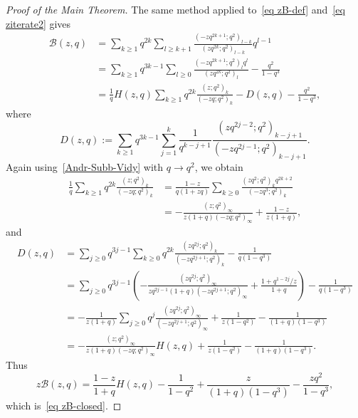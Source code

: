 \documentclass[10pt,a4paper]{amsart}
\numberwithin{equation}{section}
\begin{document}
\begin{proof}[Proof of the Main Theorem]
The same method applied to~\eqref{eq zB-def} and~\eqref{eq ziterate2} gives
\begin{align*}
\mathcal B(z,q)
&=\sum_{k\ge 1}q^{2k}\sum_{l\ge k+1}
\frac{(-zq^{2k+1};q^2)_{l-k}}{(zq^{2k};q^2)_{l-k}}q^{l-1}\\
&=\sum_{k\ge 1}q^{3k-1}\sum_{l\ge 0}
\frac{(-zq^{2k+1};q^2)_l q^l}{(zq^{2k};q^2)_l}-\frac{q^2}{1-q^3}\\
&=\frac{1}{q}H(z,q)\sum_{k\ge 1}q^{2k}\frac{(z;q^2)_k}{(-zq;q^2)_k}
-D(z,q)-\frac{q^2}{1-q^3},
\end{align*}
where
\[
D(z,q):=\sum_{k\ge 1}q^{3k-1}\sum_{j=1}^k\frac{1}{q^{k-j+1}}
\frac{(zq^{2j-2};q^2)_{k-j+1}}{(-zq^{2j-1};q^2)_{k-j+1}}.
\]
Again using~\eqref{Andr-Subb-Vidy} with $q\to q^2$, we obtain
\begin{align*}
\frac{1}{q}\sum_{k\ge 1}q^{2k}\frac{(z;q^2)_k}{(-zq;q^2)_k}
&=\frac{1-z}{q(1+zq)}\sum_{k\ge 0}\frac{(zq^2;q^2)_k q^{2k+2}}{(-zq^3;q^2)_k}\\
&=-\frac{(z;q^2)_\infty}{z(1+q)(-zq;q^2)_\infty}+\frac{1-z}{z(1+q)},
\end{align*}
and
\begin{align*}
D(z,q)
&=\sum_{j\ge 0}q^{3j-1}\sum_{k\ge 0}q^{2k}\frac{(zq^{2j};q^2)_k}{(-zq^{2j+1};q^2)_k}-\frac{1}{q(1-q^3)}\\
&=\sum_{j\ge 0}q^{3j-1}
\left(
-\frac{(zq^{2j};q^2)_\infty}{zq^{2j-1}(1+q)(-zq^{2j+1};q^2)_\infty}
+\frac{1+q^{1-2j}/z}{1+q}
\right)-\frac{1}{q(1-q^3)}\\
&=-\frac{1}{z(1+q)}\sum_{j\ge 0}q^j
\frac{(zq^{2j};q^2)_\infty}{(-zq^{2j+1};q^2)_\infty}
+\frac{1}{z(1-q^2)}-\frac{1}{(1+q)(1-q^3)}\\
&=-\frac{(z;q^2)_\infty}{z(1+q)(-zq;q^2)_\infty}H(z,q)
+\frac{1}{z(1-q^2)}-\frac{1}{(1+q)(1-q^3)}.
\end{align*}
Thus
\[
z\mathcal B(z,q)=\frac{1-z}{1+q}H(z,q)-\frac{1}{1-q^2}
+\frac{z}{(1+q)(1-q^3)}-\frac{zq^2}{1-q^3},
\]
which is~\eqref{eq zB-closed}.


\end{proof}
\end{document}
